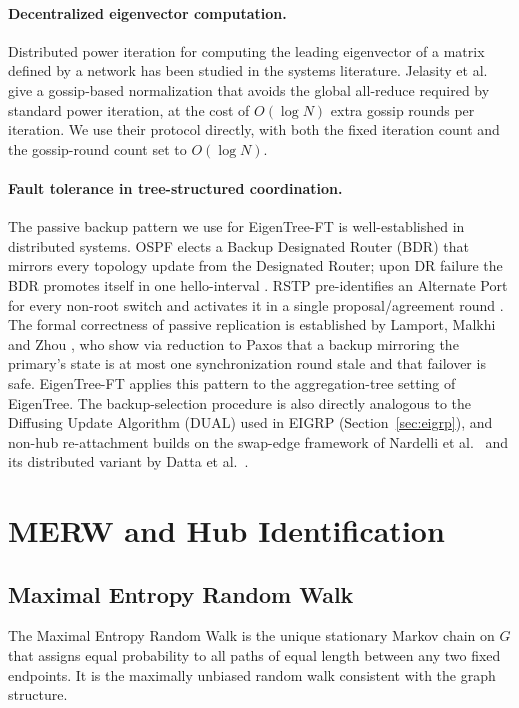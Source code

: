 \documentclass{article}
\newcommand{\merw}{EigenTree}
\newcommand{\merwft}{EigenTree-FT}
\begin{document}
\paragraph{Decentralized eigenvector computation.}
Distributed power iteration for computing the leading eigenvector of a matrix defined by a network has been studied in the systems literature. Jelasity et al.\ \citep{jelasity2007asynchronous} give a gossip-based normalization that avoids the global all-reduce required by standard power iteration, at the cost of $O(\log N)$ extra gossip rounds per iteration. We use their protocol directly, with both the fixed iteration count and the gossip-round count set to $O(\log N)$.

\paragraph{Fault tolerance in tree-structured coordination.}
The passive backup pattern we use for \merwft{} is well-established in distributed systems. OSPF elects a Backup Designated Router (BDR) that mirrors every topology update from the Designated Router; upon DR failure the BDR promotes itself in one hello-interval \citep{rfc2328}. RSTP pre-identifies an Alternate Port for every non-root switch and activates it in a single proposal/agreement round \citep{ieee8021w}. The formal correctness of passive replication is established by Lamport, Malkhi and Zhou \citep{lamport2009vertical}, who show via reduction to Paxos that a backup mirroring the primary's state is at most one synchronization round stale and that failover is safe. \merwft{} applies this pattern to the aggregation-tree setting of \merw. The backup-selection procedure is also directly analogous to the Diffusing Update Algorithm (DUAL) used in EIGRP \citep{garcia1993eigrp} (Section~\ref{sec:eigrp}), and non-hub re-attachment builds on the swap-edge framework of Nardelli et al.\ \citep{nardelli2003} and its distributed variant by Datta et al.\ \citep{datta2013}.

\section{MERW and Hub Identification}
\label{sec:merw}

\subsection{Maximal Entropy Random Walk}

The Maximal Entropy Random Walk \citep{burda2009localization} is the unique stationary Markov chain on $G$ that assigns equal probability to all paths of equal length between any two fixed endpoints. It is the maximally unbiased random walk consistent with the graph structure.
\end{document}

